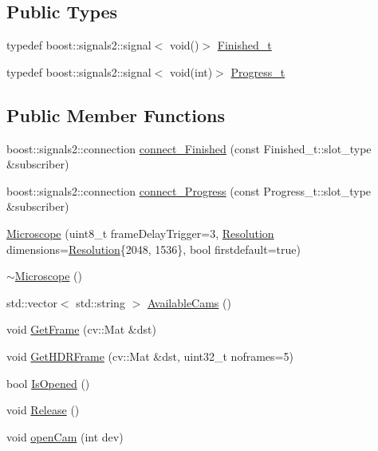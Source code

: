 \subsection*{Public Types}
\begin{DoxyCompactItemize}
\item 
typedef boost\+::signals2\+::signal$<$ void()$>$ \hyperlink{class_hardware_1_1_microscope_a40676fa031cfc911b9b180f902f1e00d}{Finished\+\_\+t}
\item 
typedef boost\+::signals2\+::signal$<$ void(int)$>$ \hyperlink{class_hardware_1_1_microscope_a2b031f9b1c8b0294da0c989dbf728d79}{Progress\+\_\+t}
\end{DoxyCompactItemize}
\subsection*{Public Member Functions}
\begin{DoxyCompactItemize}
\item 
boost\+::signals2\+::connection \hyperlink{class_hardware_1_1_microscope_abc3f008ec7cf00e6ddf31b0a4ed392cb}{connect\+\_\+\+Finished} (const Finished\+\_\+t\+::slot\+\_\+type \&subscriber)
\item 
boost\+::signals2\+::connection \hyperlink{class_hardware_1_1_microscope_abc29f83a2f0ba536df3eb7ccc250b111}{connect\+\_\+\+Progress} (const Progress\+\_\+t\+::slot\+\_\+type \&subscriber)
\item 
\hyperlink{class_hardware_1_1_microscope_a335599c313acd6f5e2f94c09a3475620}{Microscope} (uint8\+\_\+t frame\+Delay\+Trigger=3, \hyperlink{struct_hardware_1_1_microscope_1_1_resolution}{Resolution} dimensions=\hyperlink{struct_hardware_1_1_microscope_1_1_resolution}{Resolution}\{2048, 1536\}, bool firstdefault=true)
\item 
\hyperlink{class_hardware_1_1_microscope_afb6b20021157077feaf8df0e465a1f0e}{$\sim$\+Microscope} ()
\item 
std\+::vector$<$ std\+::string $>$ \hyperlink{class_hardware_1_1_microscope_a48c34d1597a9d90f61427cbd2a25bdb9}{Available\+Cams} ()
\item 
void \hyperlink{class_hardware_1_1_microscope_a1ec5c792320ae4db3f3b39830e74f880}{Get\+Frame} (cv\+::\+Mat \&dst)
\item 
void \hyperlink{class_hardware_1_1_microscope_a8cec2eacbd3f0ea164d16100a6078d5b}{Get\+H\+D\+R\+Frame} (cv\+::\+Mat \&dst, uint32\+\_\+t noframes=5)
\item 
bool \hyperlink{class_hardware_1_1_microscope_ae799dbdff39787d3226e8e8ce25386de}{Is\+Opened} ()
\item 
void \hyperlink{class_hardware_1_1_microscope_a87119548948d7af1e3c38af2e2afa482}{Release} ()
\item 
void \hyperlink{class_hardware_1_1_microscope_abc753dfc72956ef7285d0e373fb7e1f1}{open\+Cam} (int dev)
\end{DoxyCompactItemize}
